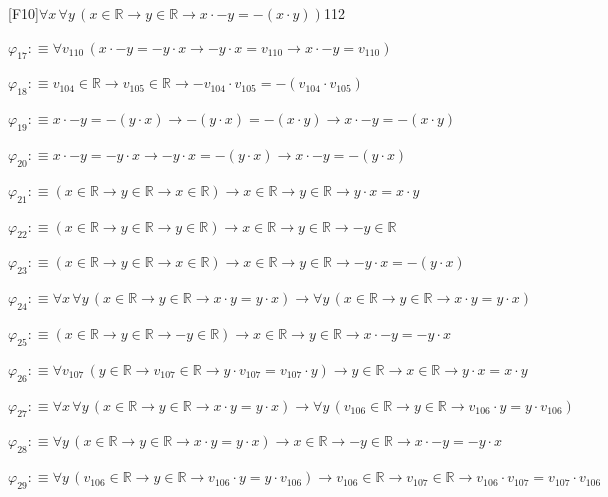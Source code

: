 \begin{fullproof}{[F10]}{$\forall x\,\forall y\,(x \in \mathbb{R} \to y \in \mathbb{R} \to x \cdot -y = -(x \cdot y))$}{112}
\begin{abbrevlist}
\item $\varphi_{17} :\equiv \forall v_{110}\,(x \cdot -y = -y \cdot x \to -y \cdot x = v_{110} \to x \cdot -y = v_{110})$
\item $\varphi_{18} :\equiv v_{104} \in \mathbb{R} \to v_{105} \in \mathbb{R} \to -v_{104} \cdot v_{105} = -(v_{104} \cdot v_{105})$
\item $\varphi_{19} :\equiv x \cdot -y = -(y \cdot x) \to -(y \cdot x) = -(x \cdot y) \to x \cdot -y = -(x \cdot y)$
\item $\varphi_{20} :\equiv x \cdot -y = -y \cdot x \to -y \cdot x = -(y \cdot x) \to x \cdot -y = -(y \cdot x)$
\item $\varphi_{21} :\equiv (x \in \mathbb{R} \to y \in \mathbb{R} \to x \in \mathbb{R}) \to x \in \mathbb{R} \to y \in \mathbb{R} \to y \cdot x = x \cdot y$
\item $\varphi_{22} :\equiv (x \in \mathbb{R} \to y \in \mathbb{R} \to y \in \mathbb{R}) \to x \in \mathbb{R} \to y \in \mathbb{R} \to -y \in \mathbb{R}$
\item $\varphi_{23} :\equiv (x \in \mathbb{R} \to y \in \mathbb{R} \to x \in \mathbb{R}) \to x \in \mathbb{R} \to y \in \mathbb{R} \to -y \cdot x = -(y \cdot x)$
\item $\varphi_{24} :\equiv \forall x\,\forall y\,(x \in \mathbb{R} \to y \in \mathbb{R} \to x \cdot y = y \cdot x) \to \forall y\,(x \in \mathbb{R} \to y \in \mathbb{R} \to x \cdot y = y \cdot x)$
\item $\varphi_{25} :\equiv (x \in \mathbb{R} \to y \in \mathbb{R} \to -y \in \mathbb{R}) \to x \in \mathbb{R} \to y \in \mathbb{R} \to x \cdot -y = -y \cdot x$
\item $\varphi_{26} :\equiv \forall v_{107}\,(y \in \mathbb{R} \to v_{107} \in \mathbb{R} \to y \cdot v_{107} = v_{107} \cdot y) \to y \in \mathbb{R} \to x \in \mathbb{R} \to y \cdot x = x \cdot y$
\item $\varphi_{27} :\equiv \forall x\,\forall y\,(x \in \mathbb{R} \to y \in \mathbb{R} \to x \cdot y = y \cdot x) \to \forall y\,(v_{106} \in \mathbb{R} \to y \in \mathbb{R} \to v_{106} \cdot y = y \cdot v_{106})$
\item $\varphi_{28} :\equiv \forall y\,(x \in \mathbb{R} \to y \in \mathbb{R} \to x \cdot y = y \cdot x) \to x \in \mathbb{R} \to -y \in \mathbb{R} \to x \cdot -y = -y \cdot x$
\item $\varphi_{29} :\equiv \forall y\,(v_{106} \in \mathbb{R} \to y \in \mathbb{R} \to v_{106} \cdot y = y \cdot v_{106}) \to v_{106} \in \mathbb{R} \to v_{107} \in \mathbb{R} \to v_{106} \cdot v_{107} = v_{107} \cdot v_{106}$

\end{abbrevlist}
\end{fullproof}
